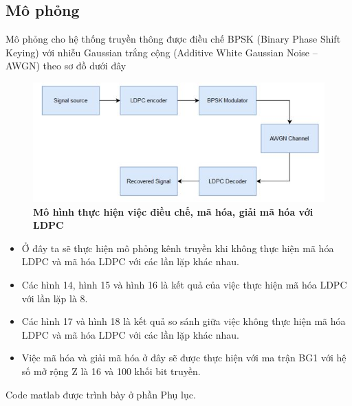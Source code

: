 \documentclass{article}
\begin{document}
\subsection{Mô phỏng}
Mô phỏng cho hệ thống truyền thông được điều chế BPSK (Binary Phase Shift Keying) với nhiễu Gaussian trắng cộng (Additive White Gaussian Noise – AWGN) theo sơ đồ dưới đây
\begin{figure}[H]
    \centering
    \includegraphics[width=12cm]{images/mohinh.JPG}
    \caption[Mô hình thực hiện việc điều chế, mã hóa, giải mã hóa với LDPC]{\bfseries\fontsize{12pt}{0pt} \selectfont Mô hình thực hiện việc điều chế, mã hóa, giải mã hóa với LDPC} %
    \label{hinh22}
\end{figure}
   \begin{itemize}
       \item 	Ở đây ta sẽ thực hiện mô phỏng kênh truyền khi không thực hiện mã hóa LDPC và mã hóa LDPC với các lần lặp khác nhau.
       \item	Các hình 14, hình 15 và hình 16 là kết quả của việc thực hiện mã hóa LDPC với lần lặp là 8.
       \item 	Các hình 17 và hình 18 là kết quả so sánh giữa việc không thực hiện mã hóa LDPC và mã hóa LDPC với các lần lặp khác nhau.
       \item Việc mã hóa và giải mã hóa ở đây sẽ được thực hiện với ma trận BG1 với hệ số mở rộng Z là 16 và 100 khối bit truyền.
   \end{itemize}
   Code matlab được trình bày ở phần Phụ lục.
\end{document}
